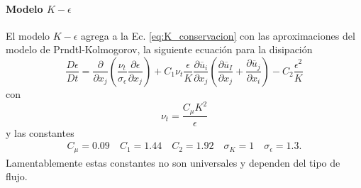 \paragraph*{Modelo $K-\epsilon$}
El modelo $K-\epsilon$ agrega a la Ec. \eqref{eq:K_conservacion} con las aproximaciones del modelo de Prndtl-Kolmogorov, la siguiente ecuación para la disipación
%
\begin{equation}
\frac{D\epsilon}{Dt} = \frac{\partial}{\partial x_j} \left(\frac{\nu_t}{\sigma_\epsilon}\frac{\partial\epsilon}{\partial x_j}\right) + C_1\nu_t\frac{\epsilon}{K}\frac{\partial\overline{u}_i}{\partial x_j} \left(\frac{\partial\overline{u}_I}{\partial x_j}+\frac{\partial\overline{u}_j}{\partial x_i}\right) - C_2\frac{\epsilon^2}{K}
\end{equation}
%
con
%
\begin{equation}
\nu_t = \frac{C_\mu K^2}{\epsilon}
\end{equation}
%
y las constantes
%
\begin{align}
C_\mu = 0.09 \quad C_1=1.44 \quad C_2 = 1.92 \quad \sigma_K = 1 \quad \sigma_\epsilon=1.3. 
\end{align}
%
Lamentablemente estas constantes no son universales y dependen del tipo de flujo.
